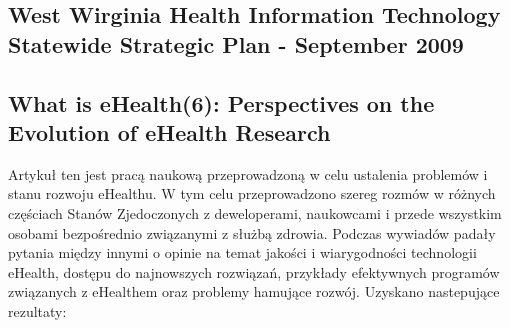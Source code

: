 \documentclass[a4paper,10pt]{article}
\begin{document}
\subsection {West Wirginia Health Information Technology Statewide Strategic Plan - September 2009}


\subsection {What is eHealth(6): Perspectives on the Evolution of eHealth Research}
Artykuł ten jest pracą naukową przeprowadzoną w celu ustalenia problemów i stanu rozwoju eHealthu. W tym celu przeprowadzono  szereg rozmów w różnych częściach Stanów Zjedoczonych z deweloperami, 
naukowcami i przede wszystkim osobami bezpośrednio związanymi z służbą zdrowia. Podczas wywiadów padały pytania  między innymi o opinie na temat jakości i wiarygodności technologii eHealth, dostępu do najnowszych rozwiązań, przykłady efektywnych programów związanych z eHealthem oraz problemy hamujące rozwój. Uzyskano nastepujące rezultaty: \\
\end{document}
